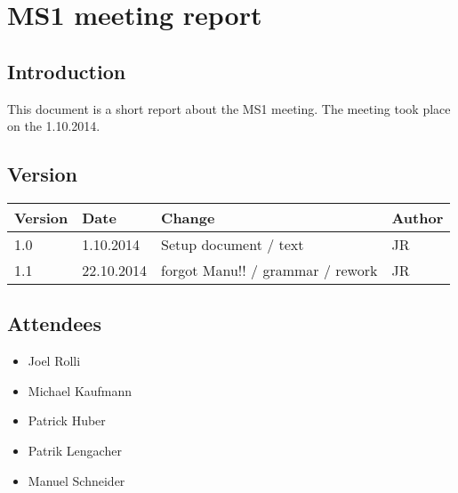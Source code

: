 
\chapter{MS1 meeting report} %

\label{ChapterX} %



\section{Introduction}

This document is a short report about the MS1 meeting. The meeting took place on the 1.10.2014.

\section{Version}


\begin{tabular}{| p{1.5cm} | p{2cm} | p{9cm} | p{1.5cm} |}
    \hline
    Version & Date      & Change & Author \\ \hline
    1.0    & 1.10.2014        & Setup document / text                                        & JR \\ \hline
    1.1    & 22.10.2014        & forgot Manu!! / grammar / rework                                        & JR \\ \hline
\end{tabular}


\section{Attendees}
\begin{itemize}
\item Joel Rolli
\item Michael Kaufmann
\item Patrick Huber
\item Patrik Lengacher
\item Manuel Schneider
\end{itemize}


